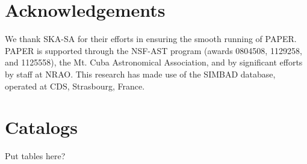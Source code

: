 \documentclass[useAMS,usenatbib]{mn2e}
\begin{document}
\section*{Acknowledgements}
We thank SKA-SA for their efforts in ensuring the smooth running of PAPER. PAPER is supported through the NSF-AST program (awards 0804508, 1129258, and 1125558), the Mt. Cuba Astronomical Association, and by significant efforts by staff at NRAO. This research has made use of the SIMBAD database, operated at CDS, Strasbourg, France.


\appendix
\section{Catalogs}
Put tables here?

\clearpage

{}
\end{document}
